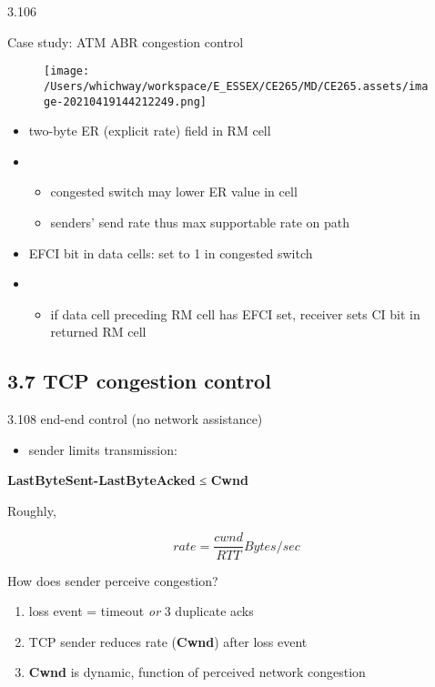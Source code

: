 \documentclass[
]{article}
\begin{document}
3.106

Case study: ATM ABR congestion control

\begin{figure}
\centering
\texttt{[image: /Users/whichway/workspace/E\_ESSEX/CE265/MD/CE265.assets/image-20210419144212249.png]}
\caption{}
\end{figure}

\begin{itemize}
\item
  two-byte ER (explicit rate) field in RM cell
\item
  \begin{itemize}
  \item
    congested switch may lower ER value in cell
  \item
    senders' send rate thus max supportable rate on path
  \end{itemize}
\item
  EFCI bit in data cells: set to 1 in congested switch
\item
  \begin{itemize}
  \item
    if data cell preceding RM cell has EFCI set, receiver sets CI bit in
    returned RM cell
  \end{itemize}
\end{itemize}

\hypertarget{37-tcp-congestion-control}{%
\subsection{3.7 TCP congestion
control}\label{37-tcp-congestion-control}}

3.108 end-end control (no network assistance)

\begin{itemize}
\item
  sender limits transmission:
\end{itemize}

\textbf{LastByteSent-LastByteAcked} ≤ \textbf{Cwnd}

Roughly,

\[rate = \frac{cwnd}{RTT} Bytes/sec\]

How does sender perceive congestion?

\begin{enumerate}
\def\labelenumi{\arabic{enumi}.}
\item
  loss event = timeout \emph{or} 3 duplicate acks
\item
  TCP sender reduces rate (\textbf{Cwnd}) after loss event
\item
  \textbf{Cwnd} is dynamic, function of perceived network congestion
\end{enumerate}
\end{document}
